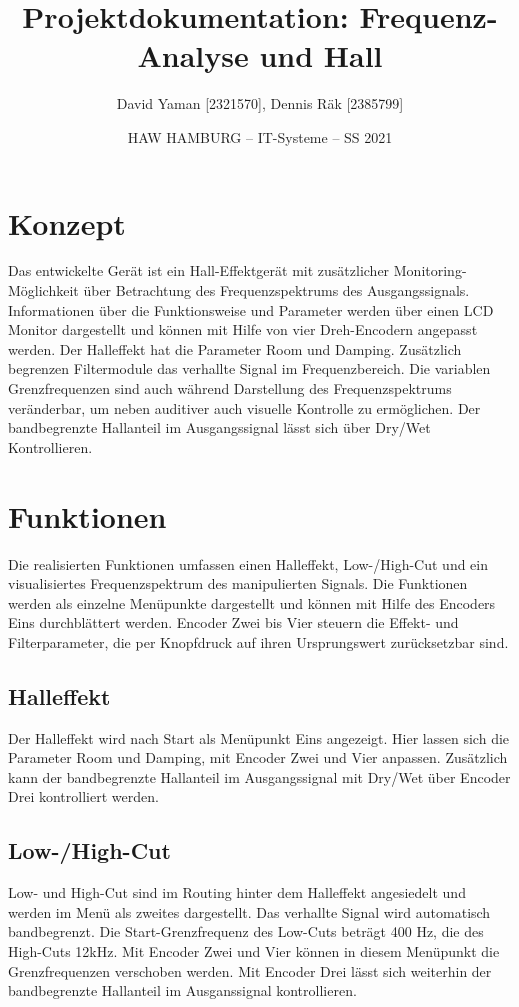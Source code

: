 \documentclass[12pt]{article}
\title{Projektdokumentation: Frequenz-Analyse und Hall}        %
\author{David Yaman [2321570], Dennis Räk [2385799]}            %
\date{HAW HAMBURG -- IT-Systeme -- SS 2021}                    %
\begin{document}
\maketitle
\newpage
\tableofcontents
\newpage
\section{Konzept}
Das entwickelte Gerät ist ein Hall-Effektgerät mit zusätzlicher Monitoring-Möglichkeit über Betrachtung des Frequenzspektrums des Ausgangssignals. 
Informationen über die Funktionsweise und Parameter werden über einen LCD Monitor dargestellt und können mit Hilfe von vier Dreh-Encodern angepasst werden. 
Der Halleffekt hat die Parameter Room und Damping. Zusätzlich begrenzen Filtermodule das verhallte Signal im Frequenzbereich. 
Die variablen Grenzfrequenzen sind auch während Darstellung des Frequenzspektrums veränderbar, um neben auditiver auch visuelle Kontrolle zu ermöglichen. 
Der bandbegrenzte Hallanteil im Ausgangssignal lässt sich über Dry/Wet Kontrollieren.
\section{Funktionen}
Die realisierten Funktionen umfassen einen Halleffekt, Low-/High-Cut und ein visualisiertes Frequenzspektrum des manipulierten Signals. 
Die Funktionen werden als einzelne Menüpunkte dargestellt und können mit Hilfe des Encoders Eins durchblättert werden. 
Encoder Zwei bis Vier steuern die Effekt- und Filterparameter, die per Knopfdruck auf ihren Ursprungswert zurücksetzbar sind.
\subsection{Halleffekt}
Der Halleffekt wird nach Start als Menüpunkt Eins angezeigt. 
Hier lassen sich die Parameter Room und Damping, mit Encoder Zwei und Vier anpassen. 
Zusätzlich kann der bandbegrenzte Hallanteil im Ausgangssignal mit Dry/Wet über Encoder Drei kontrolliert werden.
\subsection{Low-/High-Cut}
Low- und High-Cut sind im Routing hinter dem Halleffekt angesiedelt und werden im Menü als zweites dargestellt. 
Das verhallte Signal wird automatisch bandbegrenzt. 
Die Start-Grenzfrequenz des Low-Cuts beträgt 400 Hz, die des High-Cuts 12kHz. 
Mit Encoder Zwei und Vier können in diesem Menüpunkt die Grenzfrequenzen verschoben werden. 
Mit Encoder Drei lässt sich weiterhin der bandbegrenzte Hallanteil im Ausganssignal kontrollieren. 
\end{document}
